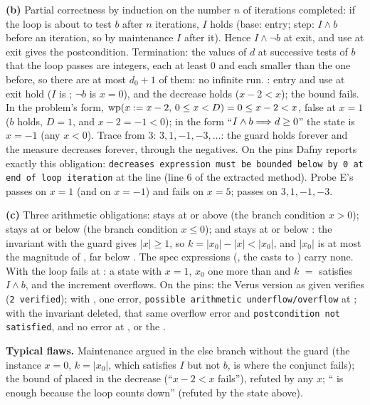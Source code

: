 \documentclass[11pt]{article}
\begin{document}
\textbf{(b)} Partial correctness by induction on the number $n$ of iterations
completed: if the loop is about to test $b$ after $n$ iterations, $I$ holds
(base: entry; step: $I \wedge b$ before an iteration, so by maintenance $I$
after it). Hence $I \wedge \neg b$ at exit, and use at exit gives the
postcondition. Termination: the values of $d$ at successive tests of $b$ that
the loop passes are integers, each at least $0$ and each smaller than the one
before, so there are at most $d_0 + 1$ of them: no infinite run. :
entry and use at exit hold ($I$ is ; $\neg b$ is $x = 0$), and the
decrease holds ($x - 2 < x$); the bound fails. In the problem's form,
$\mathrm{wp}(x \mathrel{:=} x - 2,\,0 \leq x < D) = 0 \leq x - 2 < x$, false at $x = 1$
($b$ holds, $D = 1$, and $x - 2 = -1 < 0$); in the form ``$I \wedge b \Longrightarrow d
\geq 0$'' the state is $x = -1$ (any $x < 0$). Trace from $3$: $3, 1, -1, -3,
\ldots$: the guard holds forever and the measure decreases forever, through
the negatives. On the pins Dafny reports exactly this obligation:
\texttt{decreases expression must be bounded below by 0 at end of loop
iteration} at the  line (line 6 of the extracted method).
Probe E's  passes on $x = 1$ (and on $x = -1$) and fails on
$x = 5$;  passes on $3, 1, -1, -3$.

\textbf{(c)} Three arithmetic obligations:  stays at or above
 (the branch condition $x > 0$);  stays at or below
 (the branch condition $x \leq 0$); and  stays at or
below : the invariant with the guard gives $\lvert x\rvert \geq
1$, so $k = \lvert x_0\rvert - \lvert x\rvert < \lvert x_0\rvert$, and $\lvert
x_0\rvert$ is at most the magnitude of , far below
. The spec expressions (, the casts to ) carry
none. With  the loop fails at : a state with $x = 1$,
$x_0$ one more than  and $k$ $=$  satisfies $I
\wedge b$, and the increment overflows. On the pins: the Verus version as
given verifies (\texttt{2 verified}); with , one error,
\texttt{possible arithmetic underflow/overflow} at ; with the
invariant deleted, that same overflow error and \texttt{postcondition not
satisfied}, and no error at ,  or the .

\textbf{Typical flaws.} Maintenance argued in the else branch without the
guard (the instance $x = 0$, $k = \lvert x_0\rvert$, which satisfies $I$ but not
$b$, is where the conjunct fails); the bound of  placed in the
decrease (``$x - 2 < x$ fails''), refuted by any $x$; `` is enough
because the loop counts down'' (refuted by the state above).
\end{document}
